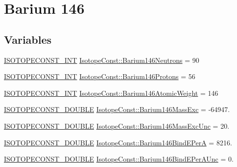 \hypertarget{group___isotope_const-_barium-_ba146}{}\section{Barium 146}
\label{group___isotope_const-_barium-_ba146}
\subsection*{Variables}
\begin{DoxyCompactItemize}
\item 
\mbox{\hyperlink{group___isotope_const-_macros_ga5f18360b3e99483a35c32d789e62621c}{I\+S\+O\+T\+O\+P\+E\+C\+O\+N\+S\+T\+\_\+\+I\+NT}} \mbox{\hyperlink{group___isotope_const-_barium-_ba146_ga05ff0990f8e67fd38aeb6ab318a293de}{Isotope\+Const\+::\+Barium146\+Neutrons}} = 90
\item 
\mbox{\hyperlink{group___isotope_const-_macros_ga5f18360b3e99483a35c32d789e62621c}{I\+S\+O\+T\+O\+P\+E\+C\+O\+N\+S\+T\+\_\+\+I\+NT}} \mbox{\hyperlink{group___isotope_const-_barium-_ba146_ga9a57d2466369db99a3f9f27d88d88dc7}{Isotope\+Const\+::\+Barium146\+Protons}} = 56
\item 
\mbox{\hyperlink{group___isotope_const-_macros_ga5f18360b3e99483a35c32d789e62621c}{I\+S\+O\+T\+O\+P\+E\+C\+O\+N\+S\+T\+\_\+\+I\+NT}} \mbox{\hyperlink{group___isotope_const-_barium-_ba146_ga852d6c86757ba74d1d89746f4d1bf87e}{Isotope\+Const\+::\+Barium146\+Atomic\+Weight}} = 146
\item 
\mbox{\hyperlink{group___isotope_const-_macros_ga8f45a7272ce02c0b4c65c44636ed719a}{I\+S\+O\+T\+O\+P\+E\+C\+O\+N\+S\+T\+\_\+\+D\+O\+U\+B\+LE}} \mbox{\hyperlink{group___isotope_const-_barium-_ba146_gab5de4742e3cd258364698309e1bf9b10}{Isotope\+Const\+::\+Barium146\+Mass\+Exc}} = -\/64947.
\item 
\mbox{\hyperlink{group___isotope_const-_macros_ga8f45a7272ce02c0b4c65c44636ed719a}{I\+S\+O\+T\+O\+P\+E\+C\+O\+N\+S\+T\+\_\+\+D\+O\+U\+B\+LE}} \mbox{\hyperlink{group___isotope_const-_barium-_ba146_gaafa4a40fc67327a2891d6712cd56351c}{Isotope\+Const\+::\+Barium146\+Mass\+Exc\+Unc}} = 20.
\item 
\mbox{\hyperlink{group___isotope_const-_macros_ga8f45a7272ce02c0b4c65c44636ed719a}{I\+S\+O\+T\+O\+P\+E\+C\+O\+N\+S\+T\+\_\+\+D\+O\+U\+B\+LE}} \mbox{\hyperlink{group___isotope_const-_barium-_ba146_gaca1dc8ac718615b9bf9dd39c70a54f55}{Isotope\+Const\+::\+Barium146\+Bind\+E\+PerA}} = 8216.
\item 
\mbox{\hyperlink{group___isotope_const-_macros_ga8f45a7272ce02c0b4c65c44636ed719a}{I\+S\+O\+T\+O\+P\+E\+C\+O\+N\+S\+T\+\_\+\+D\+O\+U\+B\+LE}} \mbox{\hyperlink{group___isotope_const-_barium-_ba146_gaf1c232882a5ecf8cf32a65ebe368f46f}{Isotope\+Const\+::\+Barium146\+Bind\+E\+Per\+A\+Unc}} = 0.

\end{DoxyCompactItemize}
